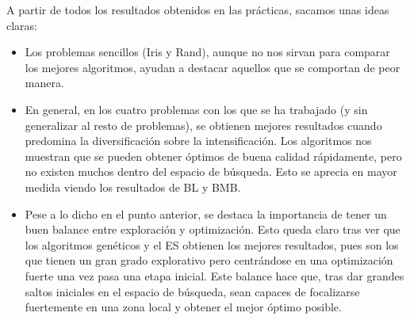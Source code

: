 A partir de todos los resultados obtenidos en las prácticas, sacamos unas ideas claras:
\begin{itemize}
    \item Los problemas sencillos (Iris y Rand), aunque no nos sirvan para comparar los mejores algoritmos, ayudan a destacar aquellos que se comportan de peor manera.
    
    \item En general, en los cuatro problemas con los que se ha trabajado (y sin generalizar al resto de problemas), se obtienen mejores resultados cuando predomina la diversificación sobre la intensificación. Los algoritmos nos muestran que se pueden obtener óptimos de buena calidad rápidamente, pero no existen muchos dentro del espacio de búsqueda. Esto se aprecia en mayor medida viendo los resultados de BL y BMB.
    
    \item Pese a lo dicho en el punto anterior, se destaca la importancia de tener un buen balance entre exploración y optimización. Esto queda claro tras ver que los algoritmos genéticos y el ES obtienen los mejores resultados, pues son los que tienen un gran grado explorativo pero centrándose en una optimización fuerte una vez pasa una etapa inicial.
    Este balance hace que, tras dar grandes saltos iniciales en el espacio de búsqueda, sean capaces de focalizarse fuertemente en una zona local y obtener el mejor óptimo posible.
\end{itemize}